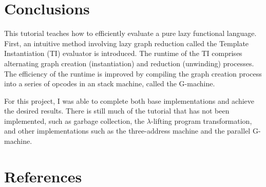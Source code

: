 \section{Conclusions}
\label{sec:conclusions}

This tutorial teaches how to efficiently evaluate a pure lazy functional language. First, an intuitive method involving lazy graph reduction called the Template Instantiation (TI) evaluator is introduced. The runtime of the TI comprises alternating graph creation (instantiation) and reduction (unwinding) processes. The efficiency of the runtime is improved by compiling the graph creation process into a series of opcodes in an stack machine, called the G-machine.

For this project, I was able to complete both base implementations and achieve the desired results. There is still much of the tutorial that has not been implemented, such as garbage collection, the $\lambda$-lifting program transformation, and other implementations such as the three-address machine and the parallel G-machine.

\section{References}
\label{sec:references}

\printbibliography[heading=none]{}

